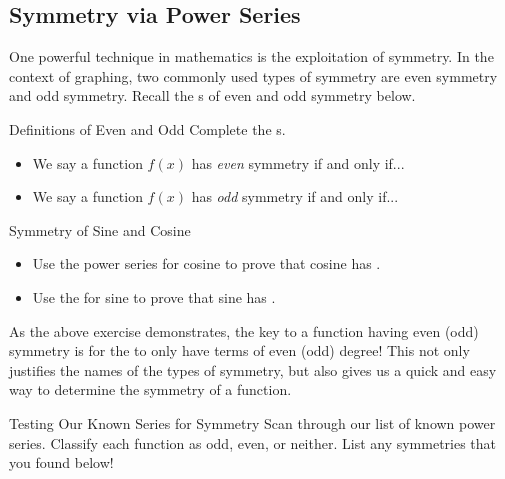 \subsection{Symmetry via Power Series}

One powerful technique in mathematics is the exploitation of symmetry.  In the context of graphing, two commonly used types of symmetry are even symmetry and odd symmetry.  Recall the s of even and odd symmetry below.

\begin{exercise}{Definitions of Even and Odd \Coffeecup}
Complete the s.
\begin{itemize}
\item We say a function $f(x)$ has \emph{even} symmetry if and only if... \vspace*{.2in}
\item We say a function $f(x)$ has \emph{odd} symmetry if and only if... \vspace*{.2in}
\end{itemize}
\end{exercise}

\begin{exercise}{Symmetry of Sine and Cosine \Coffeecup \Coffeecup}
\begin{itemize}
\item Use the power series for cosine to prove that cosine has .
\vspace*{.5in}
\item Use the  for sine to prove that sine has .
\vspace*{.5in}
\end{itemize}
\end{exercise}

As the above exercise demonstrates, the key to a function having even (odd) symmetry is for the  to only have terms of even (odd) degree!  This not only justifies the names of the types of symmetry, but also gives us a quick and easy way to determine the symmetry of a function.  

\begin{exercise}{Testing Our Known Series for Symmetry \Coffeecup \Coffeecup}
Scan through our list of known power series.  Classify each function as odd, even, or neither.  List any symmetries that you found below!
\vspace*{2in}
\end{exercise}
